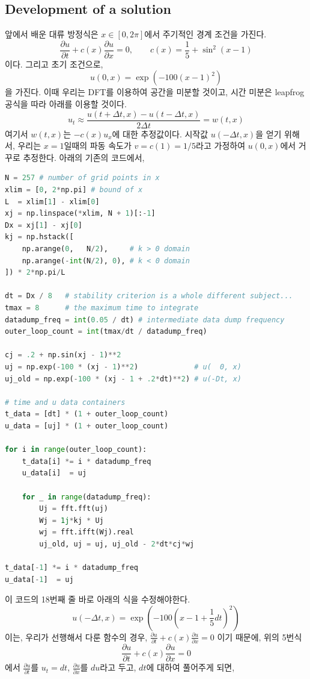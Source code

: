 \documentclass[11pt]{article}
\begin{document}
\subsection{Development of a solution} 
앞에서 배운 대류 방정식은 $x \in [0, 2\pi]$에서 주기적인 경계 조건을 가진다.
\begin{equation}
\frac{\partial u}{\partial t} + c(x) \frac{\partial u}{\partial x} = 0
,\qquad
c(x) = \frac{1}{5} + \sin^2(x - 1)
\end{equation}
이다. 그리고 초기 조건으로,
\begin{equation}
u(0, x) = \exp(-100 (x - 1)^2)
\end{equation}
을 가진다. 이때 우리는 DFT를 이용하여 공간을 미분할 것이고, 시간 미분은 leapfrog 공식을 따라 아래를 이용할 것이다.
\begin{equation}
u_t \approx \frac{u(t + \Delta t, x) - u(t - \Delta t, x)}{2\Delta t} = w(t, x)
\end{equation}
여기서 $w(t, x)$는 $-c(x)u_x$에 대한 추정값이다. 시작값 $u(-\Delta t, x)$을 얻기 위해서, 우리는 $x=1$일때의 파동 속도가 $v = c(1) = 1/5$라고 가정하여 $u(0,x)$에서 거꾸로 추정한다. 아래의 기존의 코드에서,

\begin{lstlisting}[language=Python]
N = 257 # number of grid points in x
xlim = [0, 2*np.pi] # bound of x
L  = xlim[1] - xlim[0]
xj = np.linspace(*xlim, N + 1)[:-1]
Dx = xj[1] - xj[0]
kj = np.hstack([
    np.arange(0,   N/2),     # k > 0 domain
    np.arange(-int(N/2), 0), # k < 0 domain
]) * 2*np.pi/L

dt = Dx / 8   # stability criterion is a whole different subject...
tmax = 8      # the maximum time to integrate
datadump_freq = int(0.05 / dt) # intermediate data dump frequency
outer_loop_count = int(tmax/dt / datadump_freq)

cj = .2 + np.sin(xj - 1)**2
uj = np.exp(-100 * (xj - 1)**2)             # u(  0, x)
uj_old = np.exp(-100 * (xj - 1 + .2*dt)**2) # u(-Dt, x)

# time and u data containers
t_data = [dt] * (1 + outer_loop_count)
u_data = [uj] * (1 + outer_loop_count)

for i in range(outer_loop_count):
    t_data[i] *= i * datadump_freq
    u_data[i]  = uj

    for _ in range(datadump_freq):
        Uj = fft.fft(uj)
        Wj = 1j*kj * Uj
        wj = fft.ifft(Wj).real
        uj_old, uj = uj, uj_old - 2*dt*cj*wj

t_data[-1] *= i * datadump_freq
u_data[-1]  = uj
\end{lstlisting}
이 코드의 18번째 줄 바로 아래의 식을 수정해야한다. 
\begin{equation}
u(-\Delta t, x) = \exp(-100 (x -1 + \frac{1}{5}dt)^2)
\end{equation}
이는, 우리가 선행해서 다룬 함수의 경우, $\frac{\partial u}{\partial t} + c(x) \frac{\partial u}{\partial x} = 0$ 이기 때문에, 위의 5번식
\begin{equation}
\frac{\partial u}{\partial t} + c(x) \frac{\partial u}{\partial x} = 0
\end{equation}
에서  $\frac{\partial u}{\partial t}$를 $u_t = dt$, $ \frac{\partial u}{\partial x}$를 $du$라고 두고, $dt$에 대하여 풀어주게 되면, 
\end{document}
